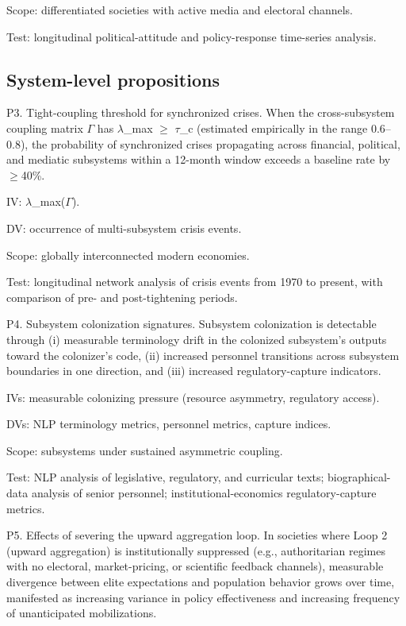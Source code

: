 \documentclass[12pt,a4paper]{article}
\begin{document}
Scope: differentiated societies with active media and electoral channels.

Test: longitudinal political-attitude and policy-response time-series analysis.

\subsection{System-level propositions}

P3. Tight-coupling threshold for synchronized crises. When the cross-subsystem coupling matrix $\Gamma$ has $\lambda$_max $\geq$ $\tau$_c (estimated empirically in the range 0.6--0.8), the probability of synchronized crises propagating across financial, political, and mediatic subsystems within a 12-month window exceeds a baseline rate by $\geq$40\%.


IV: $\lambda$_max($\Gamma$).

DV: occurrence of multi-subsystem crisis events.

Scope: globally interconnected modern economies.

Test: longitudinal network analysis of crisis events from 1970 to present, with comparison of pre- and post-tightening periods.


P4. Subsystem colonization signatures. Subsystem colonization is detectable through (i) measurable terminology drift in the colonized subsystem's outputs toward the colonizer's code, (ii) increased personnel transitions across subsystem boundaries in one direction, and (iii) increased regulatory-capture indicators.


IVs: measurable colonizing pressure (resource asymmetry, regulatory access).

DVs: NLP terminology metrics, personnel metrics, capture indices.

Scope: subsystems under sustained asymmetric coupling.

Test: NLP analysis of legislative, regulatory, and curricular texts; biographical-data analysis of senior personnel; institutional-economics regulatory-capture metrics.


P5. Effects of severing the upward aggregation loop. In societies where Loop 2 (upward aggregation) is institutionally suppressed (e.g., authoritarian regimes with no electoral, market-pricing, or scientific feedback channels), measurable divergence between elite expectations and population behavior grows over time, manifested as increasing variance in policy effectiveness and increasing frequency of unanticipated mobilizations.
\end{document}
